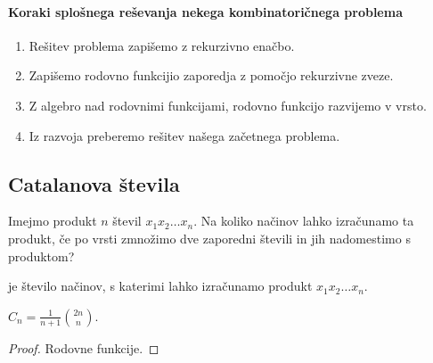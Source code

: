 \paragraph{Koraki splošnega reševanja nekega kombinatoričnega problema}
\begin{enumerate}
    \item Rešitev problema zapišemo z rekurzivno enačbo.
    \item Zapišemo rodovno funkcijio zaporedja z pomočjo rekurzivne zveze.
    \item Z algebro nad rodovnimi funkcijami, rodovno funkcijo razvijemo v vrsto.
    \item Iz razvoja preberemo rešitev našega začetnega problema.
\end{enumerate}

\subsection{Catalanova števila}
Imejmo produkt $n$ števil $x_1x_2 \ldots x_n$. Na koliko načinov lahko izračunamo ta produkt, če po vrsti zmnožimo dve zaporedni števili in jih nadomestimo s produktom?

\begin{definicija}
     je število načinov, s katerimi lahko izračunamo produkt $x_1x_2 \ldots x_n$.
\end{definicija}

\begin{trditev}
    $C_n = \frac{1}{n+1} \binom{2n}{n}$.
\end{trditev}

\begin{proof}
    Rodovne funkcije.
\end{proof}
